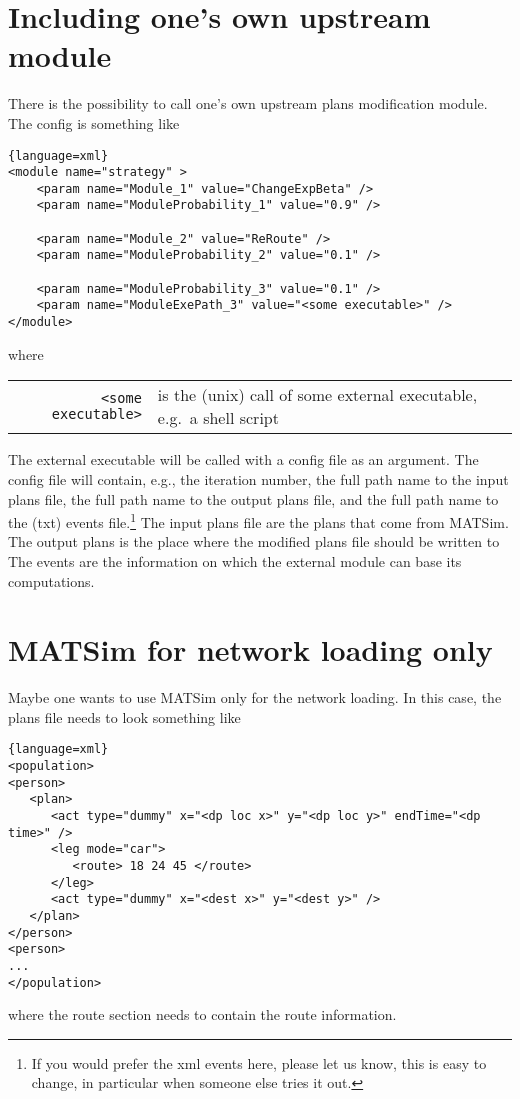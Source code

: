 \section{Including one's own upstream module}
\label{sec:including-ones-own}

There is the possibility to call one's own upstream plans modification module.  The config is something like
\begin{lstlisting}{language=xml}
<module name="strategy" >
	<param name="Module_1" value="ChangeExpBeta" />
	<param name="ModuleProbability_1" value="0.9" />

	<param name="Module_2" value="ReRoute" />
	<param name="ModuleProbability_2" value="0.1" />

	<param name="ModuleProbability_3" value="0.1" />
	<param name="ModuleExePath_3" value="<some executable>" />
</module>
\end{lstlisting}
where

\begin{tabularx}{\hsize}{rX}
\verb$<some executable>$ & is the (unix) call of some external executable, e.g.\ a shell script \\
\end{tabularx}

The external executable will be called with a config file as an argument.  The config file will contain, e.g., the iteration number, the full path name to the input plans file, the full path name to the output plans file, and the full path name to the (txt) events file.\footnote{%
%
If you would prefer the xml events here, please let us know, this is easy to change, in particular when someone else tries it out.
%
}
The input plans file are the plans that come from MATSim.  The output plans is the place where the modified plans file should be written to  The events are the information on which the external module can base its computations.

\section{MATSim for network loading only}

Maybe one wants to use MATSim only for the network loading.  In this case, the plans file needs to look something like
\begin{lstlisting}{language=xml}
<population>
<person>
   <plan>
      <act type="dummy" x="<dp loc x>" y="<dp loc y>" endTime="<dp time>" />
      <leg mode="car">
         <route> 18 24 45 </route>
      </leg>
      <act type="dummy" x="<dest x>" y="<dest y>" />
   </plan>
</person>
<person>
...
</population>
\end{lstlisting}
where the route section needs to contain the route information. 

